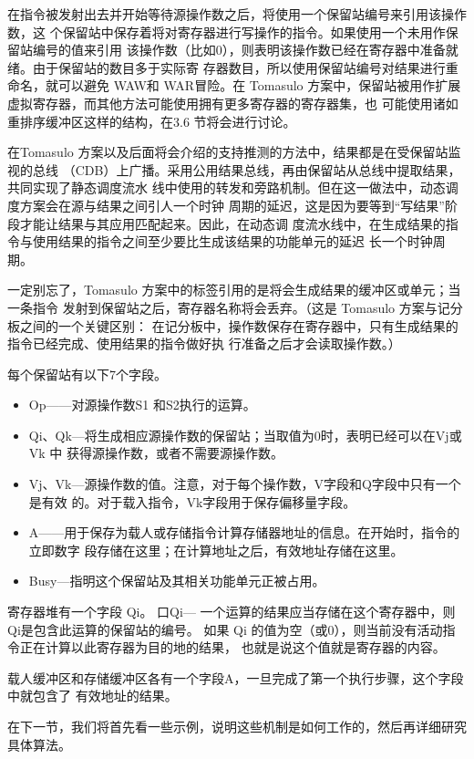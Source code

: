 在指令被发射出去并开始等待源操作数之后，将使用一个保留站编号来引用该操作数，这
个保留站中保存着将对寄存器进行写操作的指令。如果使用一个未用作保留站编号的值来引用
该操作数（比如0），则表明该操作数已经在寄存器中准备就绪。由于保留站的数目多于实际寄
存器数目，所以使用保留站编号对结果进行重命名，就可以避免 WAW和 WAR冒险。在 Tomasulo
方案中，保留站被用作扩展虚拟寄存器，而其他方法可能使用拥有更多寄存器的寄存器集，也
可能使用诸如重排序缓冲区这样的结构，在3.6 节将会进行讨论。

在Tomasulo 方案以及后面将会介绍的支持推测的方法中，结果都是在受保留站监视的总线
（CDB）上广播。采用公用结果总线，再由保留站从总线中提取结果，共同实现了静态调度流水
线中使用的转发和旁路机制。但在这一做法中，动态调度方案会在源与结果之间引人一个时钟
周期的延迟，这是因为要等到“写结果”阶段才能让结果与其应用匹配起来。因此，在动态调
度流水线中，在生成结果的指令与使用结果的指令之间至少要比生成该结果的功能单元的延迟
长一个时钟周期。

一定别忘了，Tomasulo 方案中的标签引用的是将会生成结果的缓冲区或单元；当一条指令
发射到保留站之后，寄存器名称将会丢弃。（这是 Tomasulo 方案与记分板之间的一个关键区别：
在记分板中，操作数保存在寄存器中，只有生成结果的指令已经完成、使用结果的指令做好执
行准备之后才会读取操作数。）

每个保留站有以下7个字段。

\begin{itemize}
    \item Op——对源操作数S1 和S2执行的运算。
    \item Qi、Qk—将生成相应源操作数的保留站；当取值为0时，表明已经可以在Vj或Vk 中
    获得源操作数，或者不需要源操作数。
    \item Vj、Vk—源操作数的值。注意，对于每个操作数，V字段和Q字段中只有一个是有效
    的。对于载入指令，Vk字段用于保存偏移量字段。
    \item A——用于保存为载人或存储指令计算存储器地址的信息。在开始时，指令的立即数字
    段存储在这里；在计算地址之后，有效地址存储在这里。
    \item Busy—指明这个保留站及其相关功能单元正被占用。
\end{itemize}
寄存器堆有一个字段 Qi。
口Qi—
一个运算的结果应当存储在这个寄存器中，则Qi是包含此运算的保留站的编号。
如果 Qi 的值为空（或0），则当前没有活动指令正在计算以此寄存器为目的地的结果，
也就是说这个值就是寄存器的内容。

载人缓冲区和存储缓冲区各有一个字段A，一旦完成了第一个执行步骤，这个字段中就包含了
有效地址的结果。

在下一节，我们将首先看一些示例，说明这些机制是如何工作的，然后再详细研究具体算法。

